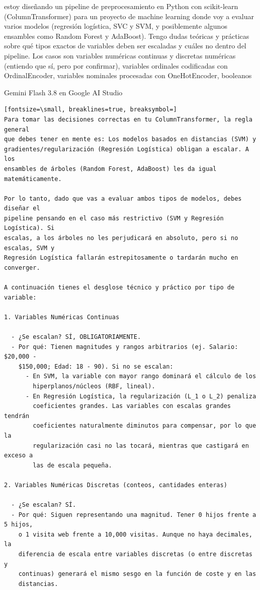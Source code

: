 \documentclass[12pt,a4paper,oneside]{book}
\begin{document}
\begin{iaprompt}
estoy diseñando un pipeline de preprocesamiento en Python con scikit-learn
(ColumnTransformer) para un proyecto de machine learning donde voy a evaluar
varios modelos (regresión logística, SVC y SVM, y posiblemente algunos ensambles
como Random Forest y AdaBoost). Tengo dudas teóricas y prácticas sobre qué tipos
exactos de variables deben ser escaladas y cuáles no dentro del pipeline. Los
casos son variables numéricas continuas y discretas numéricas (entiendo que sí,
pero por confirmar), variables ordinales codificadas con OrdinalEncoder,
variables nominales procesadas con OneHotEncoder, booleanos
\end{iaprompt}
\begin{iaresp}{Gemini Flash 3.8 en Google AI Studio}
\begin{Verbatim}[fontsize=\small, breaklines=true, breaksymbol=]
Para tomar las decisiones correctas en tu ColumnTransformer, la regla general
que debes tener en mente es: Los modelos basados en distancias (SVM) y
gradientes/regularización (Regresión Logística) obligan a escalar. A los
ensambles de árboles (Random Forest, AdaBoost) les da igual matemáticamente.

Por lo tanto, dado que vas a evaluar ambos tipos de modelos, debes diseñar el
pipeline pensando en el caso más restrictivo (SVM y Regresión Logística). Si
escalas, a los árboles no les perjudicará en absoluto, pero si no escalas, SVM y
Regresión Logística fallarán estrepitosamente o tardarán mucho en converger.

A continuación tienes el desglose técnico y práctico por tipo de variable:

1. Variables Numéricas Continuas

  - ¿Se escalan? SÍ, OBLIGATORIAMENTE.
  - Por qué: Tienen magnitudes y rangos arbitrarios (ej. Salario: $20,000 -
    $150,000; Edad: 18 - 90). Si no se escalan:
      - En SVM, la variable con mayor rango dominará el cálculo de los
        hiperplanos/núcleos (RBF, lineal).
      - En Regresión Logística, la regularización (L_1 o L_2) penaliza
        coeficientes grandes. Las variables con escalas grandes tendrán
        coeficientes naturalmente diminutos para compensar, por lo que la
        regularización casi no las tocará, mientras que castigará en exceso a
        las de escala pequeña.

2. Variables Numéricas Discretas (conteos, cantidades enteras)

  - ¿Se escalan? SÍ.
  - Por qué: Siguen representando una magnitud. Tener 0 hijos frente a 5 hijos,
    o 1 visita web frente a 10,000 visitas. Aunque no haya decimales, la
    diferencia de escala entre variables discretas (o entre discretas y
    continuas) generará el mismo sesgo en la función de coste y en las
    distancias.


\end{Verbatim}
\end{iaresp}
\end{document}
